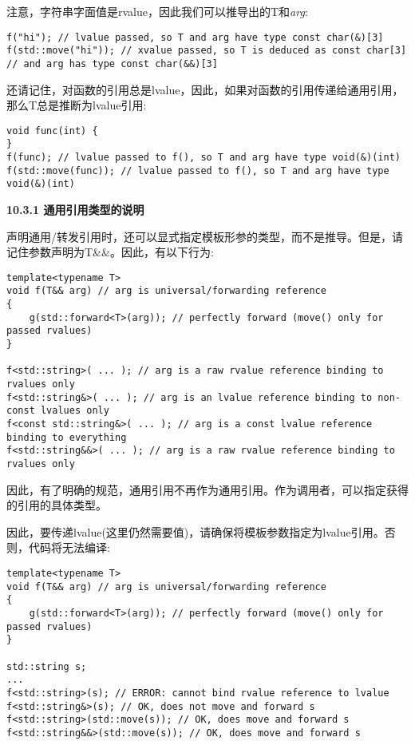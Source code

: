 注意，字符串字面值是rvalue，因此我们可以推导出的T和\textit{arg}:\par

\begin{lstlisting}[caption={}]
f("hi"); // lvalue passed, so T and arg have type const char(&)[3]
f(std::move("hi")); // xvalue passed, so T is deduced as const char[3]
// and arg has type const char(&&)[3]
\end{lstlisting}

还请记住，对函数的引用总是lvalue，因此，如果对函数的引用传递给通用引用，那么T总是推断为lvalue引用:\par

\begin{lstlisting}[caption={}]
void func(int) {
}
f(func); // lvalue passed to f(), so T and arg have type void(&)(int)
f(std::move(func)); // lvalue passed to f(), so T and arg have type void(&)(int)
\end{lstlisting}

\hspace*{\fill} \par %
\textbf{10.3.1 通用引用类型的说明}

声明通用/转发引用时，还可以显式指定模板形参的类型，而不是推导。但是，请记住参数声明为T\&\&。因此，有以下行为:\par

\begin{lstlisting}[caption={}]
template<typename T>
void f(T&& arg) // arg is universal/forwarding reference
{
	g(std::forward<T>(arg)); // perfectly forward (move() only for passed rvalues)
}

f<std::string>( ... ); // arg is a raw rvalue reference binding to rvalues only
f<std::string&>( ... ); // arg is an lvalue reference binding to non-const lvalues only
f<const std::string&>( ... ); // arg is a const lvalue reference binding to everything
f<std::string&&>( ... ); // arg is a raw rvalue reference binding to rvalues only
\end{lstlisting}

因此，有了明确的规范，通用引用不再作为通用引用。作为调用者，可以指定获得的引用的具体类型。\par

因此，要传递lvalue(这里仍然需要值)，请确保将模板参数指定为lvalue引用。否则，代码将无法编译:\par

\begin{lstlisting}[caption={}]
template<typename T>
void f(T&& arg) // arg is universal/forwarding reference
{
	g(std::forward<T>(arg)); // perfectly forward (move() only for passed rvalues)
}

std::string s;
...
f<std::string>(s); // ERROR: cannot bind rvalue reference to lvalue
f<std::string&>(s); // OK, does not move and forward s
f<std::string>(std::move(s)); // OK, does move and forward s
f<std::string&&>(std::move(s)); // OK, does move and forward s
\end{lstlisting}

